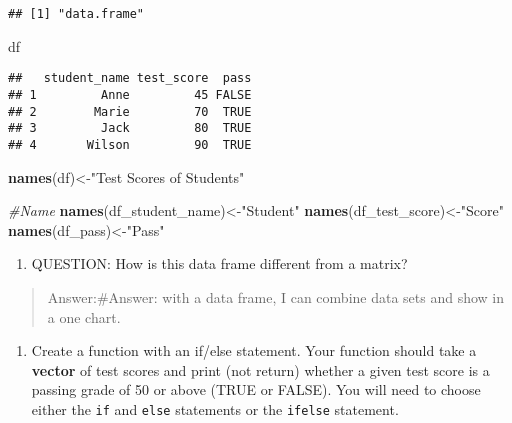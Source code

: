 \documentclass[
]{article}
\newenvironment{Shaded}{\begin{snugshade}}{\end{snugshade}}
\newcommand{\CommentTok}[1]{\textcolor[rgb]{0.56,0.35,0.01}{\textit{#1}}}
\newcommand{\FunctionTok}[1]{\textcolor[rgb]{0.13,0.29,0.53}{\textbf{#1}}}
\newcommand{\NormalTok}[1]{#1}
\newcommand{\OtherTok}[1]{\textcolor[rgb]{0.56,0.35,0.01}{#1}}
\newcommand{\StringTok}[1]{\textcolor[rgb]{0.31,0.60,0.02}{#1}}
\providecommand{\tightlist}{%
  \setlength{\itemsep}{0pt}\setlength{\parskip}{0pt}}
\begin{document}
\begin{verbatim}
## [1] "data.frame"
\end{verbatim}

\begin{Shaded}
\begin{Highlighting}[]
\NormalTok{df}
\end{Highlighting}
\end{Shaded}

\begin{verbatim}
##   student_name test_score  pass
## 1         Anne         45 FALSE
## 2        Marie         70  TRUE
## 3         Jack         80  TRUE
## 4       Wilson         90  TRUE
\end{verbatim}

\begin{Shaded}
\begin{Highlighting}[]
\FunctionTok{names}\NormalTok{(df)}\OtherTok{\textless{}{-}}\StringTok{"Test Scores of Students"}

\CommentTok{\#Name}
\FunctionTok{names}\NormalTok{(df\_student\_name)}\OtherTok{\textless{}{-}}\StringTok{"Student"}
\FunctionTok{names}\NormalTok{(df\_test\_score)}\OtherTok{\textless{}{-}}\StringTok{"Score"}
\FunctionTok{names}\NormalTok{(df\_pass)}\OtherTok{\textless{}{-}}\StringTok{"Pass"}
\end{Highlighting}
\end{Shaded}

\begin{enumerate}
\def\labelenumi{\arabic{enumi}.}
\setcounter{enumi}{8}
\tightlist
\item
  QUESTION: How is this data frame different from a matrix?
\end{enumerate}

\begin{quote}
Answer:\#Answer: with a data frame, I can combine data sets and show in
a one chart.
\end{quote}

\begin{enumerate}
\def\labelenumi{\arabic{enumi}.}
\setcounter{enumi}{9}
\tightlist
\item
  Create a function with an if/else statement. Your function should take
  a \textbf{vector} of test scores and print (not return) whether a
  given test score is a passing grade of 50 or above (TRUE or FALSE).
  You will need to choose either the \texttt{if} and \texttt{else}
  statements or the \texttt{ifelse} statement.
\end{enumerate}
\end{document}
